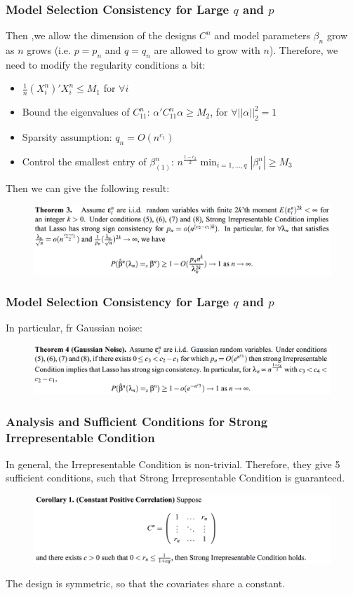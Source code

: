 \documentclass{beamer}
\begin{document}
	\begin{frame}
		\frametitle{Model Selection Consistency for Large $q$ and $p$}
		Then ,we allow the dimension of the designs $C^n$ and model parameters $\beta_n$ grow as $n$ grows (i.e. $p=p_n$ and $q = q_n$ are allowed to grow with $n$). Therefore, we need to modify the regularity conditions a bit:
		\begin{itemize}
			\item 
			$\frac{1}{n}(X_i^n)'X_i^n \leq M_1$ for $\forall i$
			\item
			Bound the eigenvalues of $C_{11}^n$: $\alpha'C_{11}^n \alpha \geq M_2$, for $\forall ||\alpha||_2^2 = 1$
			\item
			Sparsity assumption: $q_n = O(n^{c_1})$
			\item
			Control the smallest entry of $\beta_{(1)}^n$: $n^{\frac{1-c_2}{2}}\min_{i=1,\ldots,q}|\beta_i^n| \geq M_3$
		\end{itemize} 
		Then we can give the following result:
		\begin{figure}
			\includegraphics[width=1\linewidth]{image008.png}
		\end{figure}
	\end{frame}
		
	\begin{frame}
		\frametitle{Model Selection Consistency for Large $q$ and $p$}
		In particular, fr Gaussian noise:
		\begin{figure}
			\includegraphics[width=1\linewidth]{image009.png}
		\end{figure}
	\end{frame}
	
	\begin{frame}
		\frametitle{Analysis and Sufficient Conditions for Strong Irrepresentable Condition}
		In general, the Irrepresentable Condition is non-trivial. Therefore, they give 5 sufficient conditions, such that Strong Irrepresentable Condition is guaranteed.
		\begin{figure}
			\includegraphics[width=1\linewidth]{image010.png}
		\end{figure}
		The design is symmetric, so that the covariates share a constant.
	\end{frame}
	
\end{document}
